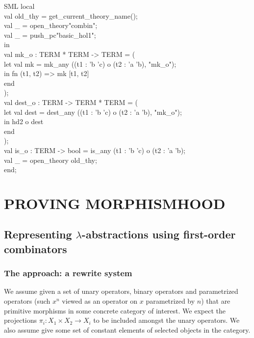 \documentclass[11pt,a4paper]{article}
\def\To{\rightarrow}
\begin{document}
\begin{GFT}{SML}
\+local \\
\+	val old\_thy = get\_current\_theory\_name();\\
\+	val \_ = open\_theory"combin";\\
\+	val \_ = push\_pc"basic\_hol1";\\
\+in\\
\+val \PrNL{}mk\_o\PrNN{} : TERM * TERM -> TERM = (\\
\+	let	val mk = mk\_any (\PrKM{}(t1 : 'b \PrKN{} 'c) o (t2 : 'a \PrKN{} 'b)\PrKO{}, "mk\_o");\\
\+	in	fn (t1, t2) => mk [t1, t2]\\
\+	end\\
\+);\\
\+val \PrNL{}dest\_o\PrNN{} : TERM -> TERM * TERM = (\\
\+	let	val dest = dest\_any (\PrKM{}(t1 : 'b \PrKN{} 'c) o (t2 : 'a \PrKN{} 'b)\PrKO{}, "mk\_o");\\
\+	in	hd2 o dest\\
\+	end\\
\+);\\
\+val \PrNL{}is\_o\PrNN{} : TERM -> bool = is\_any \PrKM{}(t1 : 'b \PrKN{} 'c) o (t2 : 'a \PrKN{} 'b)\PrKO{};\\
\+val \_ = open\_theory old\_thy;\\
\+end;\\
\end{GFT}
\section{PROVING MORPHISMHOOD}
\subsection{Representing $\lambda$-abstractions using first-order combinators}

\subsubsection{The approach: a rewrite system}

We assume given a set of unary operators, binary operators and
parametrized operators (such $x^n$ viewed as an operator on $x$ parametrized by $n$) that are primitive morphisms in some concrete category of interest.
We expect the projections $\pi_i : X_1 \times X_2 \To X_i$ to be included amongst the unary operators.
We also assume give some set of constant elements of selected objects
in the category.
\end{document}
